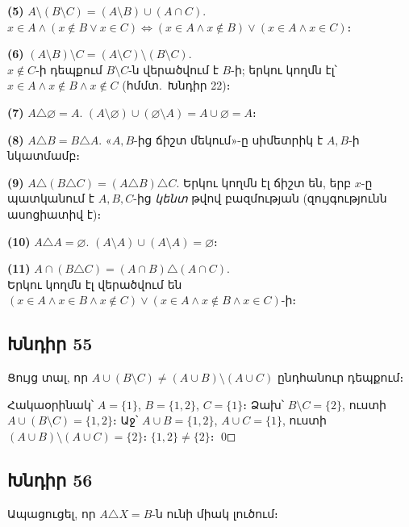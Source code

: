 \textbf{(5)} $A \setminus (B \setminus C) = (A \setminus B) \cup (A \cap C)$. \\
$x \in A \land (x \notin B \lor x \in C) \iff (x \in A \land x \notin B) \lor (x \in A \land x \in C)$։ \checkmark

\textbf{(6)} $(A \setminus B) \setminus C = (A \setminus C) \setminus (B \setminus C)$. \\
$x \notin C$-ի դեպքում $B \setminus C$-ն վերածվում է $B$-ի; երկու կողմն էլ՝ $x \in A \land x \notin B \land x \notin C$ (հմմտ.\ Խնդիր 22)։ \checkmark

\textbf{(7)} $A \triangle \varnothing = A$. \quad $(A \setminus \varnothing) \cup (\varnothing \setminus A) = A \cup \varnothing = A$։ \checkmark

\textbf{(8)} $A \triangle B = B \triangle A$. \quad «$A, B$-ից ճիշտ մեկում»-ը սիմետրիկ է $A, B$-ի նկատմամբ։ \checkmark

\textbf{(9)} $A \triangle (B \triangle C) = (A \triangle B) \triangle C$. \quad Երկու կողմն էլ ճիշտ են, երբ $x$-ը պատկանում է $A, B, C$-ից \emph{կենտ} թվով բազմության (զույգությունն ասոցիատիվ է)։ \checkmark

\textbf{(10)} $A \triangle A = \varnothing$. \quad $(A \setminus A) \cup (A \setminus A) = \varnothing$։ \checkmark

\textbf{(11)} $A \cap (B \triangle C) = (A \cap B) \triangle (A \cap C)$. \\
Երկու կողմն էլ վերածվում են $(x \in A \land x \in B \land x \notin C) \lor (x \in A \land x \notin B \land x \in C)$-ի։ \checkmark

\subsection*{Խնդիր 55}
Ցույց տալ, որ $A \cup (B \setminus C) \neq (A \cup B) \setminus (A \cup C)$ ընդհանուր դեպքում։

Հակաօրինակ՝ $A = \{1\}$, $B = \{1,2\}$, $C = \{1\}$։
Ձախ՝ $B \setminus C = \{2\}$, ուստի $A \cup (B \setminus C) = \{1,2\}$։
Աջ՝ $A \cup B = \{1,2\}$, $A \cup C = \{1\}$, ուստի $(A \cup B) \setminus (A \cup C) = \{2\}$։
$\{1,2\} \neq \{2\}$։ \qed

\subsection*{Խնդիր 56}
Ապացուցել, որ $A \triangle X = B$-ն ունի միակ լուծում։


